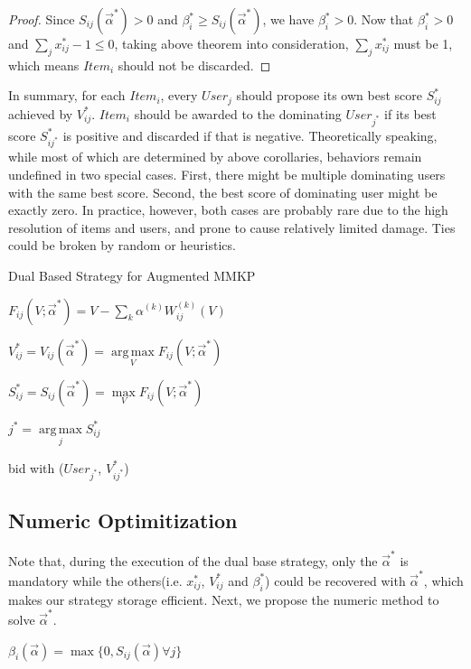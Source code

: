 \documentclass[sigconf]{acmart}
\DeclareMathOperator*{\argmax}{arg\,max}
\newcommand{\sumk}{\sum\limits_k}
\newcommand{\sx}{x_{ij}}
\newcommand{\sV}{V_{ij}}
\newcommand{\sW}{W_{ij}^{(k)}}
\newcommand{\salpha}{\alpha^{(k)}}
\newcommand{\sbeta}{\beta_i}
\newcommand{\sF}{F_{ij}}
\newcommand{\sS}{S_{ij}}
\newcommand{\valpha}{\vec{\alpha}}
\begin{document}
\begin{proof}
Since $\sS(\valpha^*) > 0$ and $\sbeta^* \ge \sS(\valpha^*)$, we have $\sbeta^* > 0$.
Now that $\sbeta^* > 0$ and $\sum\limits_j \sx^* - 1 \le 0$,
    taking above theorem into consideration, $\sum\limits_j \sx^*$ must be 1,
    which means $Item_i$ should not be discarded.
\end{proof}

In summary, for each $Item_i$, every $User_j$ should propose its own best score $\sS^*$ achieved by $\sV^*$.
$Item_i$ should be awarded to the dominating $User_{j^*}$ if its best score $S_{ij^*}^*$ is positive and discarded if that is negative.
Theoretically speaking, while most of which are determined by above corollaries, behaviors remain undefined in two special cases.
First, there might be multiple dominating users with the same best score.
Second, the best score of dominating user might be exactly zero.
In practice, however, both cases are probably rare due to the high resolution of items and users, and prone to cause relatively limited damage.
Ties could be broken by random or heuristics.

\begin{algorithm}
\caption{Dual Based Strategy for Augmented MMKP}

{
  {
    $\sF(V; \valpha^*) = V - \sumk \salpha \sW(V)$

    $\sV^* = \sV(\valpha^*) = \argmax\limits_V \sF(V; \valpha^*)$

    $\sS^* = \sS(\valpha^*) = \max\limits_V \sF(V; \valpha^*)$
  }
  $j^* = \argmax\limits_j \sS^*$
  
   { bid with ($User_{j^*}$, $V_{ij^*}^*$) }
}
\end{algorithm}

\subsection{Numeric Optimitization}

Note that, during the execution of the dual base strategy,
    only the $\valpha^*$ is mandatory while the others(i.e. $\sx^*$, $\sV^*$ and $\sbeta^*$) could be recovered with $\valpha^*$,
    which makes our strategy storage efficient.
Next, we propose the numeric method to solve $\valpha^*$.

\begin{definition}
$\sbeta(\valpha) = \max \{ 0, \sS(\valpha) \forall j \}$
\end{definition}
\end{document}
